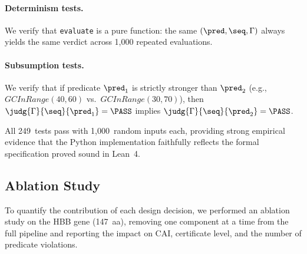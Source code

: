 \paragraph{Determinism tests.}
We verify that \texttt{evaluate} is a pure function: the same
$(\pred, \seq, \Gamma)$ always yields the same verdict across 1,000
repeated evaluations.

\paragraph{Subsumption tests.}
We verify that if predicate $\pred_1$ is strictly stronger than
$\pred_2$ (e.g., $\mathit{GCInRange}(40, 60)$ vs.\
$\mathit{GCInRange}(30, 70)$), then $\judg{\Gamma}{\seq}{\pred_1} =
\PASS$ implies $\judg{\Gamma}{\seq}{\pred_2} = \PASS$.

All 249~tests pass with 1,000~random inputs each, providing strong
empirical evidence that the Python implementation faithfully reflects
the formal specification proved sound in Lean~4.

\subsection{Ablation Study}\label{sec:ablation}

To quantify the contribution of each design decision, we performed an
ablation study on the HBB gene (147~aa), removing one component at a
time from the full pipeline and reporting the impact on CAI, certificate
level, and the number of predicate violations.

